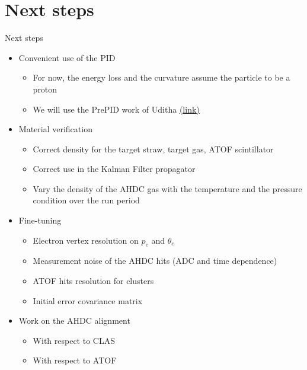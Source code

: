 \documentclass[10pt,aspectratio=43]{beamer}
\begin{document}
\section{Next steps}
\begin{frame}{Next steps}
    \begin{itemize}
        \item Convenient use of the PID
            \begin{itemize}
                \item For now, the energy loss and the curvature assume the particle to be a proton
                \item We will use the PrePID work of Uditha \href{https://indico.jlab.org/event/1017/\#73-alert-ai-particle-identific}{(\underline{link}) {\scriptsize \faExternalLink*}}
            \end{itemize}
        \item Material verification
            \begin{itemize}
                \item Correct density for the target straw, target gas, ATOF scintillator
                \item Correct use in the Kalman Filter propagator
                \item Vary the density of the AHDC gas with the temperature and the pressure condition over the run period
            \end{itemize}
        \item Fine-tuning
            \begin{itemize}
                \item Electron vertex resolution on $p_e$ and $\theta_e$
                \item Measurement noise of the AHDC hits (ADC and time dependence)
                \item ATOF hits resolution for clusters
                \item Initial error covariance matrix
            \end{itemize}
        \item Work on the AHDC alignment
            \begin{itemize}
                \item With respect to CLAS
                \item With respect to ATOF
            \end{itemize}
    \end{itemize}


\end{frame}
\end{document}

